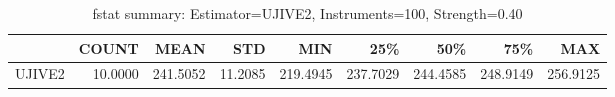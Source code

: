 \begin{table}[ht]
\centering
\caption{fstat summary: Estimator=UJIVE2, Instruments=100, Strength=0.40}
\begin{tabular}{lrrrrrrrr}
\toprule
 & COUNT & MEAN & STD & MIN & 25\% & 50\% & 75\% & MAX \\
\midrule
UJIVE2 & 10.0000 & 241.5052 & 11.2085 & 219.4945 & 237.7029 & 244.4585 & 248.9149 & 256.9125 \\
\bottomrule
\end{tabular}
\end{table}
